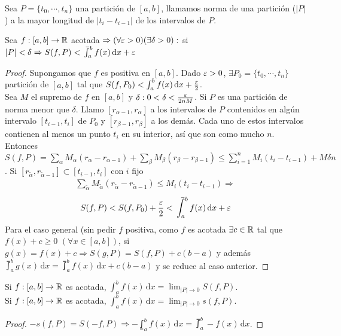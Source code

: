 \begin{definition}
  Sea \(P = \{t_0, \cdots, t_n\}\) una partición de \([a, b]\), llamamos norma de una partición (\(|P|\)) a la mayor longitud de \(|t_i - t_{i-1}|\)  de los intervalos de \(P\).
\end{definition}

\begin{theorem}
  Sea \(f: [a, b] \to \mathbb{R}\) acotada \(\Rightarrow (\forall \varepsilon > 0)(\exists \delta > 0) :\) si \(|P| < \delta \Rightarrow S(f, P) < \upint_a^b f(x) \, \mathrm{d}x + \e\)
  \begin{proof}
    Supongamos que \(f\) es positiva en \([a, b]\). Dado \(\varepsilon > 0\), \(\exists P_0 = \{t_0, \cdots, t_n\}\) partición de \([a, b]\) tal que \(S(f, P_0) < \int_a^b f(x) \, \mathrm{d}x + \frac{\varepsilon}{2}\). \\
    Sea \(M\) el supremo de \(f\) en \([a, b]\) y \(\delta : 0 < \delta < \frac{\varepsilon}{2nM}\). Si \(P\) es una partición de norma menor que \(\delta\). Llamo \([r_{\alpha - 1}, r_{\alpha}]\) a los intervalos de \(P\) contenidos en algún intervalo \([t_{i-1}, t_i]\) de \(P_0\) y \([r_{\beta - 1}, r_{\beta}]\) a los demás. Cada uno de estos intervalos contienen al menos un punto \(t_i\) en su interior, así que son como mucho \(n\). Entonces \(S(f, P) = \sum_{\alpha} M_{\alpha} (r_{\alpha} - r_{\alpha - 1}) + \sum_{\beta} M_{\beta} (r_{\beta} - r_{\beta - 1}) \leq \sum_{i = 1}^n M_i (t_i - t_{i-1}) + M \delta n\).
    Si \([r_{\tilde{\alpha}}, r_{\tilde{\alpha}-1}] \subset [t_{i-1}, t_i]\) con \(i\) fijo \begin{align*}
      \sum_{\tilde{\alpha}} M_{\tilde{\alpha}} (r_{\tilde{\alpha}} - r_{\tilde{\alpha}-1}) \leq M_i (t_i - t_{i-1}) \Rightarrow
    \end{align*}
    \begin{align*}
      S(f, P) < S(f, P_0) + \frac{\e}{2} < \upint_a^b f(x) \, \mathrm{d}x + \e
    \end{align*}
    Para el caso general (sin pedir \(f\) positiva, como \(f\) es acotada \(\exists c \in \mathbb{R}\) tal que \(f(x) + c \geq 0\) \((\forall x \in [a, b])\), si \(g(x) = f(x) + c \Rightarrow S(g, P) = S(f, P) + c (b-a)\) y además \(\upint_a^b g(x) \, \mathrm{d}x = \upint_a^b f(x) \, \mathrm{d}x + c (b-a)\) y se reduce al caso anterior.
  \end{proof}
\end{theorem}


\begin{corollary}
  Si \(f: [a, b] \to \mathbb{R}\) es acotada, \(\int_a^b f(x) \, \mathrm{d}x = \lim_{|P| \to 0} S(f, P)\). \\
  Si \(f: [a, b] \to \mathbb{R}\) es acotada, \(\int_a^b f(x) \, \mathrm{d}x = \lim_{|P| \to 0} s(f, P)\).
  \begin{proof}
    \(-s(f, P) = S(-f, P) \Rightarrow - \lowint_a^b f(x)\, \mathrm{d}x = \upint_a^b -f(x) \, \mathrm{d}x\).
  \end{proof}
\end{corollary}

